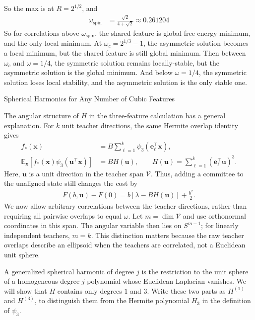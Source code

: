 \documentclass[11pt, reqno]{amsart}
\makeatletter
\def\section{\@startsection{section}{1}%
  \z@{.7\linespacing\@plus\linespacing}{.5\linespacing}%
  {\normalfont\scshape\centering}}
\theoremstyle{notestyle}
\theoremstyle{defstyle}
\makeatother
\begin{document}
So the max is at $R = 2^{1/2}$, and
\begin{align*}
    \omega_\text{spin}
    &= \frac{\sqrt{2}}{4+\sqrt{2}}
    \approx 0.261204
\end{align*}
So for correlations above $\omega_\text{spin}$, the shared feature is global free energy minimum, and the only local minimum. At $\omega_c = 2^{1/3}-1$, the asymmetric solution becomes a local minimum, but the shared feature is still global minimum.
Then between $\omega_c$ and $\omega = 1/4$, the symmetric solution remains locally-stable, but the asymmetric solution is the global minimum.
And below $\omega = 1/4$, the symmetric solution loses local stability, and the asymmetric solution is the only stable one.

\section{Spherical Harmonics for Any Number of Cubic Features}
\label{sec:cubic-spherical-harmonics}

The angular structure of $H$ in the three-feature calculation has a general explanation.
For $k$ unit teacher directions, the same Hermite overlap identity gives
\begin{align*}
    f_*(\mathbf x) &= B\sum_{\ell=1}^k \psi_3(\mathbf e_\ell^\top\mathbf x), \\
    \mathbb E_{\mathbf x}\left[f_*(\mathbf x)\psi_3(\mathbf u^\top\mathbf x)\right]
    &= B H(\mathbf u),
    \qquad H(\mathbf u) = \sum_{\ell=1}^k (\mathbf e_\ell^\top\mathbf u)^3.
\end{align*}
Here, $\mathbf u$ is a unit direction in the teacher span $\mathcal V$.
Thus, adding a committee to the unaligned state still changes the cost by
\begin{align*}
    F(b,\mathbf u)-F(0) = b[\lambda-BH(\mathbf u)]+\frac{b^2}{2}.
\end{align*}
We now allow arbitrary correlations between the teacher directions, rather than requiring all pairwise overlaps to equal $\omega$.
Let $m=\dim\mathcal V$ and use orthonormal coordinates in this span.
The angular variable then lies on $S^{m-1}$; for linearly independent teachers, $m=k$.
This distinction matters because the raw teacher overlaps describe an ellipsoid when the teachers are correlated, not a Euclidean unit sphere.

A generalized spherical harmonic of degree $j$ is the restriction to the unit sphere of a homogeneous degree-$j$ polynomial whose Euclidean Laplacian vanishes.
We will show that $H$ contains only degrees $1$ and $3$.
Write these two parts as $H^{(1)}$ and $H^{(3)}$, to distinguish them from the Hermite polynomial $H_3$ in the definition of $\psi_3$.
\end{document}
